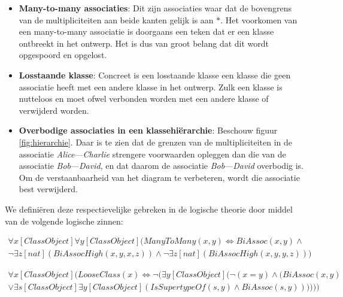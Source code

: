\begin{itemize}
	\item \textbf{Many-to-many associaties}: Dit zijn associaties waar dat de bovengrens van de multipliciteiten aan beide kanten gelijk is aan $*$. Het voorkomen van een many-to-many associatie is doorgaans een teken dat er een klasse ontbreekt in het ontwerp. Het is dus van groot belang dat dit wordt opgespoord en opgelost.
	
	\item \textbf{Losstaande klasse}: Concreet is een losstaande klasse een klasse die geen associatie heeft met een andere klasse in het ontwerp. Zulk een klasse is nutteloos en moet ofwel verbonden worden met een andere klasse of verwijderd worden.
	
	\item \textbf{Overbodige associaties in een klassehi\"erarchie}\cite{Balaban2015}: Beschouw figuur \ref{fig:hierarchie}. Daar is te zien dat de grenzen van de multipliciteiten in de associatie \textit{Alice}---\textit{Charlie} strengere voorwaarden opleggen dan die van de associatie \textit{Bob}---\textit{David}, en dat daarom de associatie \textit{Bob}---\textit{David} overbodig is. Om de verstaanbaarheid van het diagram te verbeteren, wordt die associatie best verwijderd.
\end{itemize}

We defini\"eren deze respectievelijke gebreken in de logische theorie door middel van de volgende logische zinnen:

\begin{align}
	\nonumber \forall{x}[ClassObject]\forall{y}[ClassObject](ManyToMany(x,y) \Leftrightarrow BiAssoc(x,y) \land \\ \lnot\exists{z}[nat](BiAssocHigh(x,y,x,z)) \land \lnot\exists{z}[nat](BiAssocHigh(x,y,y,z)))\label{form:manytomany}
\end{align}

\begin{align}
	\nonumber \forall{x}[ClassObject](LooseClass(x) \Leftrightarrow \lnot(\exists{y}[ClassObject](\lnot(x = y) \land (BiAssoc(x,y) \\ \lor \exists{s}[ClassObject]\exists{y}[ClassObject](IsSupertypeOf(s,y) \land BiAssoc(s,y))))))\label{form:loose}
\end{align}

